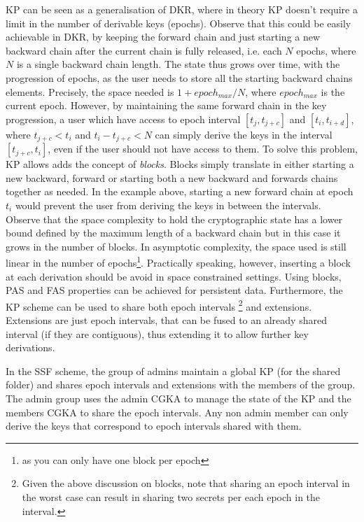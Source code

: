 KP can be seen as a generalisation of DKR, where in theory KP doesn't require
a limit in the number of derivable keys (epochs).
Observe that this could be easily achievable in DKR, by keeping the forward chain
and just starting a new backward chain after the current chain is fully released,
i.e. each $N$ epochs, where $N$ is a single backward chain length.
The state thus grows over time, with the progression of epochs, as the user needs to store
all the starting backward chains elements. Precisely, the space needed
is $1 + epoch_{max} / N$, where $epoch_{max}$ is the current epoch.
However, by maintaining the same forward chain in the key progression,
a user which have access to epoch interval 
$[t_j, t_{j + c}]$ and $[t_i, t_{i + d}]$, 
where $t_{j + c} < t_i$ and $t_i - t_{j + c} < N$  
can simply derive the keys in the interval $[t_{j + c}, t_i]$, even if 
the user should not have access to them.
To solve this problem, KP allows adds the concept of \textit{blocks}.
Blocks simply translate in either starting a new backward, forward or 
starting both a new backward and forwards chains together as needed. 
In the example above, starting a new forward chain
at epoch $t_i$ would prevent the user from deriving the keys in between 
the intervals. Observe that the space complexity to hold the cryptographic
state has a lower bound defined by the maximum length of a backward chain
but in this case it grows in the number of blocks. In asymptotic
complexity, the space used is still linear in the number of epochs\footnote{as you can only have one block per epoch}.
Practically speaking, however, inserting a block at each derivation
should be avoid in space constrained settings. 
Using blocks, PAS and FAS properties can be achieved for persistent data.
Furthermore, the KP scheme can be used to share both epoch intervals
\footnote{Given the above discussion on blocks, note that sharing an epoch interval in the worst case can result in sharing two secrets per each epoch in the interval.}
and extensions. Extensions are just epoch intervals, that can be fused 
to an already shared interval (if they are contiguous), thus extending it to
allow further key derivations.

In the SSF scheme, the group of admins maintain a global KP (for the shared folder)
and shares epoch intervals and extensions with the members of the group.
The admin group uses the admin CGKA to manage the state of the KP and the members
CGKA to share the epoch intervals. 
Any non admin member can only derive the keys
that correspond to epoch intervals shared with them.

